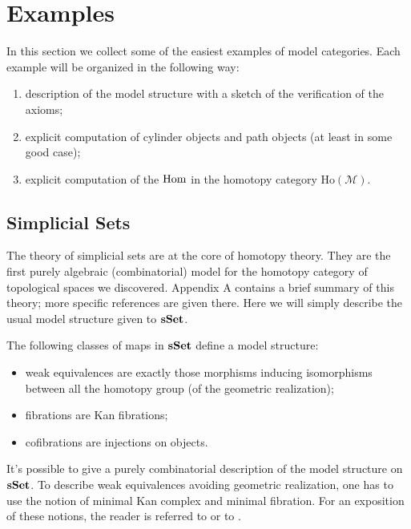 \section{Examples}

In this section we collect some of the easiest examples of model categories. Each example will be organized in the following way:

\begin{enumerate}
\item description of the model structure with a sketch of the verification of the axioms;
\item explicit computation of cylinder objects and path objects (at least in some good case);
\item explicit computation of the $\mathrm{Hom}$ in the homotopy category $\mathrm{Ho}(\mathcal M)$.
\end{enumerate}

\subsection{Simplicial Sets}

The theory of simplicial sets are at the core of homotopy theory. They are the first purely algebraic (combinatorial) model for the homotopy category of topological spaces we discovered. Appendix A contains a brief summary of this theory; more specific references are given there. Here we will simply describe the usual model structure given to $\mathbf{sSet}$.

\begin{thm} \label{thm model structure on sset}
The following classes of maps in $\mathbf{sSet}$ define a model structure:
\begin{itemize}
\item weak equivalences are exactly those morphisms inducing isomorphisms between all the homotopy group (of the geometric realization);
\item fibrations are Kan fibrations;
\item cofibrations are injections on objects.
\end{itemize}
\end{thm}

\begin{rmk}
It's possible to give a purely combinatorial description of the model structure on $\mathbf{sSet}$. To describe weak equivalences avoiding geometric realization, one has to use the notion of minimal Kan complex and minimal fibration. For an exposition of these notions, the reader is referred to \cite{may} or to \cite[I.10]{gj}.
\end{rmk}

